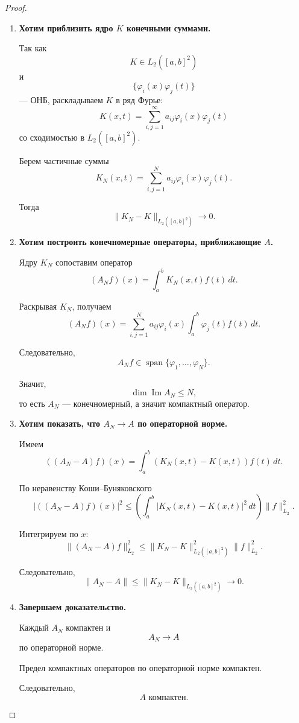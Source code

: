 \begin{proof}
	\begin{enumerate}
		\item
		\textbf{Хотим приблизить ядро \(K\) конечными суммами.}
		
		Так как
		\[
		K\in L_2([a,b]^2)
		\]
		и
		\[
		\{\varphi_i(x)\varphi_j(t)\}
		\]
		--- ОНБ, раскладываем \(K\) в ряд Фурье:
		\[
		K(x,t)
		=
		\sum_{i,j=1}^{\infty}
		a_{ij}\varphi_i(x)\varphi_j(t)
		\]
		со сходимостью в \(L_2([a,b]^2)\).
		
		Берем частичные суммы
		\[
		K_N(x,t)
		=
		\sum_{i,j=1}^{N}
		a_{ij}\varphi_i(x)\varphi_j(t).
		\]
		
		Тогда
		\[
		\|K_N-K\|_{L_2([a,b]^2)}
		\to0.
		\]
		
		\item
		\textbf{Хотим построить конечномерные операторы, приближающие \(A\).}
		
		Ядру \(K_N\) сопоставим оператор
		\[
		(A_Nf)(x)
		=
		\int_a^b K_N(x,t)f(t)\,dt.
		\]
		
		Раскрывая \(K_N\), получаем
		\[
		(A_Nf)(x)
		=
		\sum_{i,j=1}^{N}
		a_{ij}\varphi_i(x)
		\int_a^b\varphi_j(t)f(t)\,dt.
		\]
		
		Следовательно,
		\[
		A_Nf
		\in
		\operatorname{span}
		\{\varphi_1,\ldots,\varphi_N\}.
		\]
		
		Значит,
		\[
		\dim\operatorname{Im}A_N\leq N,
		\]
		то есть \(A_N\) --- конечномерный, а значит компактный оператор.
		
		\item
		\textbf{Хотим показать, что \(A_N\to A\) по операторной норме.}
		
		Имеем
		\[
		((A_N-A)f)(x)
		=
		\int_a^b
		(K_N(x,t)-K(x,t))f(t)\,dt.
		\]
		
		По неравенству Коши--Буняковского
		\[
		|((A_N-A)f)(x)|^2
		\leq
		\left(
		\int_a^b|K_N(x,t)-K(x,t)|^2\,dt
		\right)
		\|f\|_{L_2}^2.
		\]
		
		Интегрируем по \(x\):
		\[
		\|(A_N-A)f\|_{L_2}^2
		\leq
		\|K_N-K\|_{L_2([a,b]^2)}^2
		\|f\|_{L_2}^2.
		\]
		
		Следовательно,
		\[
		\boxed{
			\|A_N-A\|
			\leq
			\|K_N-K\|_{L_2([a,b]^2)}
			\to0.
		}
		\]
		
		\item
		\textbf{Завершаем доказательство.}
		
		Каждый \(A_N\) компактен и
		\[
		A_N\to A
		\]
		по операторной норме.
		
		Предел компактных операторов по операторной норме компактен.
		
		Следовательно,
		\[
		\boxed{A\text{ компактен}.}
		\]
	\end{enumerate}
\end{proof}

